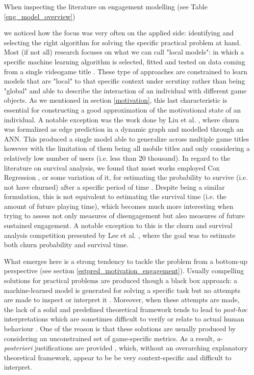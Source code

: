 When inspecting the literature on engagement modelling (see Table \ref{eng_model_overview}) 



we noticed how the focus was very often on the applied side: identifying and selecting the right algorithm for solving the specific practical problem at hand. Most (if not all) research focuses on what we can call "local models": in which a specific machine learning algorithm is selected, fitted and tested on data coming from a single videogame title \cite{runge2014churn, hadiji2014predicting, xie2015predicting, kim2017churn}. These type of approaches are constrained to learn models that are "local" to that specific context under scrutiny rather than being "global" and able to describe the interaction of an individual with different game objects. As we mentioned in section \ref{motivation}, this last characteristic is essential for constructing a good approximation of the motivational state of an individual. A notable exception was the work done by Liu et al. \cite{liu2018semi}, where churn was formalized as edge prediction in a dynamic graph and modelled through an ANN. This produced a single model able to generalize across multiple game titles however with the limitation of them being all mobile titles and only considering a relatively low number of users (i.e. less than 20 thousand). In regard to the literature on survival analysis, we found that most works employed Cox Regression \cite{cox1972regression}, or some variation of it, for estimating the probability to survive (i.e. not have churned) after a specific period of time \cite{perianez2016churn, bertens2017games, demediuk2018player}. Despite being a similar formulation, this is not equivalent to estimating the survival time (i.e. the amount of future playing time), which becomes much more interesting when trying to assess not only measures of disengagement but also measures of future sustained engagement. A notable exception to this is the churn and survival analysis competition presented by Lee et al. \cite{lee2018game}, where the goal was to estimate both churn probability and survival time. 

What emerges here is a strong tendency to tackle the problem from a bottom-up perspective (see section \ref{estpred_motivation_engagement}). Usually compelling solutions for practical problems are produced though a black box approach: a machine-learned model is generated for solving a specific task but no attempts are made to inspect or interpret it \cite{lee2018game, liu2019micro, del2020time, kristensen2019combining}. Moreover, when these attempts are made, the lack of a solid and predefined theoretical framework tends to lead to \textit{post-hoc} interpretations which are sometimes difficult to verify or relate to actual human behaviour \cite{drachen2016rapid, del2019profiling}. One of the reason is that these solutions are usually produced by considering an unconstrained set of game-specific metrics. As a result, \textit{a-posteriori} justifications are provided \cite{drachen2012guns, makarovych2018like, drachen2009player}, which, without an overarching explanatory theoretical framework, appear to be be very context-specific and difficult to interpret. 

